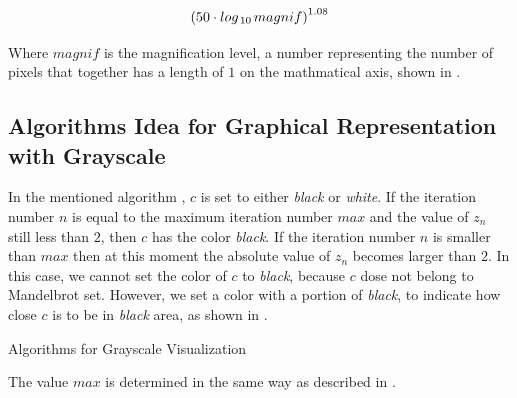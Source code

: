 \begin{equation}
    \label{eq:max}
    {(50 \cdot log_{\thinspace 10 \thinspace}{magnif})}^{1.08}
\end{equation}

Where $magnif$ is the magnification level, a number representing the number of pixels that together has a length of $1$ on the mathmatical axis, shown in .

\subsection*{Algorithms Idea for Graphical Representation with Grayscale}

In the mentioned algorithm , $c$ is set to either \emph{black} or \emph{white}. If the iteration number $n$ is equal to the maximum iteration number $max$ and the value of $z_n$ still less than $2$, then $c$ has the color \emph{black}. If the iteration number $n$ is smaller than $max$ then at this moment the absolute value of $z_n$ becomes larger than $2$. In this case, we cannot set the color of $c$ to \emph{black}, because $c$ dose not belong to Mandelbrot set. However, we set a color with a portion of \emph{black}, to indicate how close $c$ is to be in \emph{black} area, as shown in .

\begin{algorithm}[H]
    \caption{Algorithms for Grayscale Visualization}
    \label{alg:grayscale}
\end{algorithm}

The value $max$ is determined in the same way as described in .